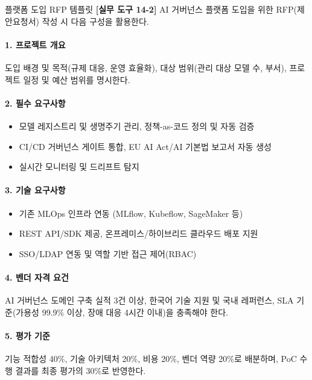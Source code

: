 \begin{practicaltool}{플랫폼 도입 RFP 템플릿}
\textbf{[실무 도구 14-2]} AI 거버넌스 플랫폼 도입을 위한 RFP(제안요청서) 작성 시 다음 구성을 활용한다.

\paragraph{1. 프로젝트 개요}
도입 배경 및 목적(규제 대응, 운영 효율화), 대상 범위(관리 대상 모델 수, 부서), 프로젝트 일정 및 예산 범위를 명시한다.

\paragraph{2. 필수 요구사항}
\begin{itemize}
    \item 모델 레지스트리 및 생명주기 관리, 정책-as-코드 정의 및 자동 검증
    \item CI/CD 거버넌스 게이트 통합, EU AI Act/AI 기본법 보고서 자동 생성
    \item 실시간 모니터링 및 드리프트 탐지
\end{itemize}

\paragraph{3. 기술 요구사항}
\begin{itemize}
    \item 기존 MLOps 인프라 연동 (MLflow, Kubeflow, SageMaker 등)
    \item REST API/SDK 제공, 온프레미스/하이브리드 클라우드 배포 지원
    \item SSO/LDAP 연동 및 역할 기반 접근 제어(RBAC)
\end{itemize}

\paragraph{4. 벤더 자격 요건}
AI 거버넌스 도메인 구축 실적 3건 이상, 한국어 기술 지원 및 국내 레퍼런스, SLA 기준(가용성 99.9\% 이상, 장애 대응 4시간 이내)을 충족해야 한다.

\paragraph{5. 평가 기준}
기능 적합성 40\%, 기술 아키텍처 20\%, 비용 20\%, 벤더 역량 20\%로 배분하며, PoC 수행 결과를 최종 평가의 30\%로 반영한다.
\end{practicaltool}

